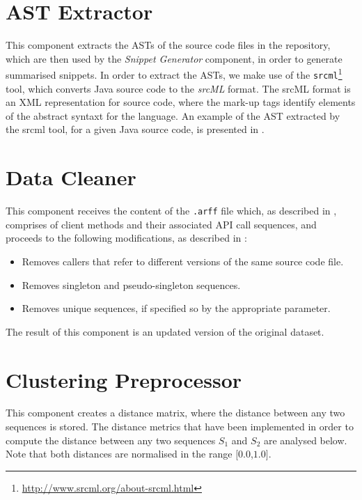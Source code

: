 \section{AST Extractor}
\label{sec:ast-extractor}

This component extracts the ASTs of the source code files in the repository, which are then used by the \textit{Snippet Generator} component, in order to generate summarised snippets. In order to extract the ASTs, we make use of the \texttt{srcml}\footnote{\url{http://www.srcml.org/about-srcml.html}} tool, which converts Java source code to the \textit{srcML} format. The srcML format is an XML representation for source code, where the mark-up tags identify elements of the abstract syntaxt for the language. An example of the AST extracted by the srcml tool, for a given Java source code, is presented in .


\section{Data Cleaner}
\label{sec:data-cleaner}

This component receives the content of the \texttt{.arff} file which, as described in , comprises of client methods and their associated API call sequences, and proceeds to the following modifications, as described in :

\begin{itemize}
\setlength\itemsep{1pt}
\item Removes callers that refer to different versions of the same source code file.
\item Removes singleton and pseudo-singleton sequences.
\item Removes unique sequences, if specified so by the appropriate parameter.
\end{itemize}

The result of this component is an updated version of the original dataset.

\vspace{-10pt}
\section{Clustering Preprocessor}
\label{sec:clustering-preprocessor}

This component creates a distance matrix, where the distance between any two sequences is stored. The distance metrics that have been implemented in order to compute the distance between any two sequences $S_1$ and $S_2$ are analysed below. Note that both distances are normalised in the range ${[}0.0$,$1.0{]}$.

